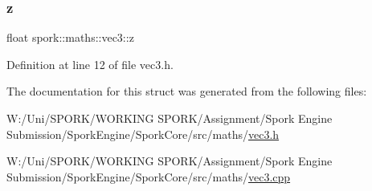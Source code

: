 \subsubsection{\texorpdfstring{z}{z}}
{\footnotesize\ttfamily float spork\+::maths\+::vec3\+::z}



Definition at line 12 of file vec3.\+h.



The documentation for this struct was generated from the following files\+:\begin{DoxyCompactItemize}
\item 
W\+:/\+Uni/\+S\+P\+O\+R\+K/\+W\+O\+R\+K\+I\+N\+G S\+P\+O\+R\+K/\+Assignment/\+Spork Engine Submission/\+Spork\+Engine/\+Spork\+Core/src/maths/\hyperlink{vec3_8h}{vec3.\+h}\item 
W\+:/\+Uni/\+S\+P\+O\+R\+K/\+W\+O\+R\+K\+I\+N\+G S\+P\+O\+R\+K/\+Assignment/\+Spork Engine Submission/\+Spork\+Engine/\+Spork\+Core/src/maths/\hyperlink{vec3_8cpp}{vec3.\+cpp}\end{DoxyCompactItemize}
